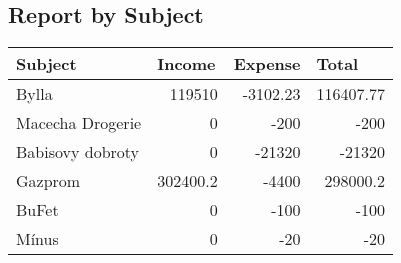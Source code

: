 \documentclass{article}
\begin{document}
        \subsection*{Report by Subject}
        \begin{tabular}{ | l | l | l | l | }
        \hline               

        \bfseries Subject &
        \bfseries Income &
        \bfseries Expense &
        \bfseries Total \\
        \hline
          
        Bylla &
            \multicolumn{1}{|r|}{119510} &
            \multicolumn{1}{|r|}{-3102.23} &
            \multicolumn{1}{|r|}{116407.77} \\
            \hline 
        Macecha Drogerie &
            \multicolumn{1}{|r|}{0} &
            \multicolumn{1}{|r|}{-200} &
            \multicolumn{1}{|r|}{-200} \\
            \hline 
        Babisovy dobroty &
            \multicolumn{1}{|r|}{0} &
            \multicolumn{1}{|r|}{-21320} &
            \multicolumn{1}{|r|}{-21320} \\
            \hline 
        Gazprom &
            \multicolumn{1}{|r|}{302400.2} &
            \multicolumn{1}{|r|}{-4400} &
            \multicolumn{1}{|r|}{298000.2} \\
            \hline 
        BuFet &
            \multicolumn{1}{|r|}{0} &
            \multicolumn{1}{|r|}{-100} &
            \multicolumn{1}{|r|}{-100} \\
            \hline 
        Mínus &
            \multicolumn{1}{|r|}{0} &
            \multicolumn{1}{|r|}{-20} &
            \multicolumn{1}{|r|}{-20} \\
            \hline 
        

        \hline  
        \end{tabular}

        
\end{document}
